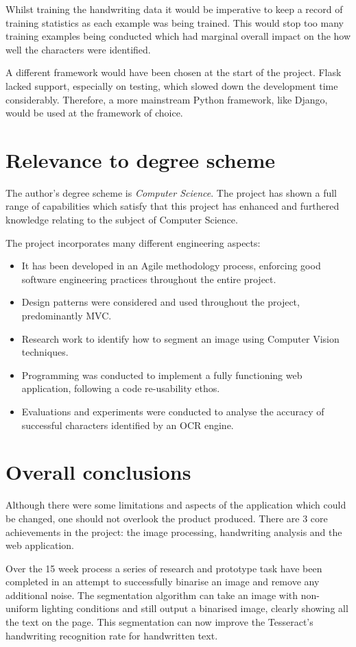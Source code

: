 Whilst training the handwriting data it would be imperative to keep a record of  training statistics as each example was being trained. This would stop too many training examples being conducted which had marginal overall impact on the how well the characters were identified.

A different framework would have been chosen at the start of the project. Flask lacked support, especially on testing, which slowed down the development time considerably. Therefore, a more mainstream Python framework, like Django, would be used at the framework of choice.

\section{Relevance to degree scheme}
The author's degree scheme is \textit{Computer Science}. The project has shown a full range of capabilities which satisfy that this project has enhanced and furthered knowledge relating to the subject of Computer Science.

The project incorporates many different engineering aspects:
\begin{itemize}
	\item It has been developed in an Agile methodology process, enforcing good software engineering practices throughout the entire project.
	\item Design patterns were considered and used throughout the project, predominantly MVC.
	\item Research work to identify how to segment an image using Computer Vision techniques.
	\item Programming was conducted to implement a fully functioning web application, following a code re-usability ethos.
	\item Evaluations and experiments were conducted to analyse the accuracy of successful characters identified by an OCR engine.
\end{itemize}

\section{Overall conclusions}
Although there were some limitations and aspects of the application which could be changed, one should not overlook the product produced. There are 3 core achievements in the project: the image processing, handwriting analysis and the web application.

Over the 15 week process a series of research and prototype task have been completed in an attempt to successfully binarise an image and remove any additional noise. The segmentation algorithm can take an image with non-uniform lighting conditions and still output a binarised image, clearly showing all the text on the page. This segmentation can now improve the Tesseract's handwriting recognition rate for handwritten text.

